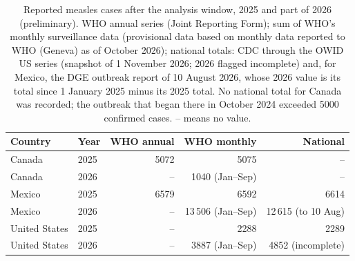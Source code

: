 \begin{table}[htbp]
\centering
\small
\caption{Reported measles cases after the analysis window, 2025 and part of 2026 (preliminary). WHO annual series (Joint Reporting Form); sum of WHO's monthly surveillance data (provisional data based on monthly data reported to WHO (Geneva) as of October 2026); national totals: CDC through the OWID US series (snapshot of 1 November 2026; 2026 flagged incomplete) and, for Mexico, the DGE outbreak report of 10 August 2026, whose 2026 value is its total since 1 January 2025 minus its 2025 total. No national total for Canada was recorded; the outbreak that began there in October 2024 exceeded 5000 confirmed cases. -- means no value.}
\label{tab:post2024}
\begin{tabular}{llrrr}
\toprule
Country & Year & WHO annual & WHO monthly & National \\
\midrule
Canada & 2025 & 5072 & 5075 & -- \\
Canada & 2026 & -- & 1040 (Jan--Sep) & -- \\
Mexico & 2025 & 6579 & 6592 & 6614 \\
Mexico & 2026 & -- & 13\,506 (Jan--Sep) & 12\,615 (to 10 Aug) \\
United States & 2025 & -- & 2288 & 2289 \\
United States & 2026 & -- & 3887 (Jan--Sep) & 4852 (incomplete) \\
\bottomrule
\end{tabular}
\end{table}
